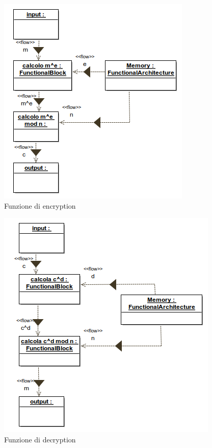 \begin{figure}[h!] 
    \centering 
    \includegraphics[scale=0.6]{img/RSA/Encryption_Object_diagram.png} 
    \caption{Funzione di encryption} 
\end{figure}
\newpage
\begin{figure}[h!] 
    \centering 
    \includegraphics[scale=0.6]{img/RSA/Decryption_Object_diagram.png} 
    \caption{Funzione di decryption} 
\end{figure}
\newpage



    
